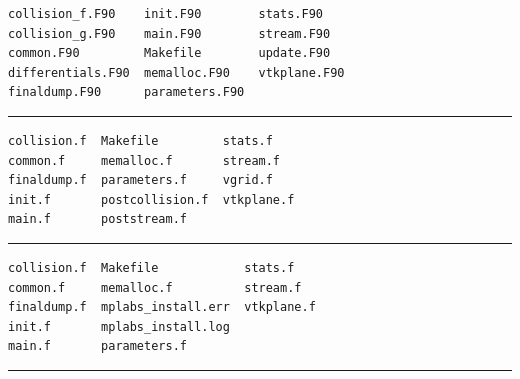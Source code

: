 \documentclass[12pt]{report}
\begin{document}

\begin{verbatim}
collision_f.F90    init.F90        stats.F90
collision_g.F90    main.F90        stream.F90
common.F90         Makefile        update.F90
differentials.F90  memalloc.F90    vtkplane.F90
finaldump.F90      parameters.F90
\end{verbatim}
\hrule\vspace{1em}
\pagebreak


\begin{verbatim}
collision.f  Makefile         stats.f
common.f     memalloc.f       stream.f
finaldump.f  parameters.f     vgrid.f
init.f       postcollision.f  vtkplane.f
main.f       poststream.f
\end{verbatim}
\hrule\vspace{1em}
\pagebreak


\begin{verbatim}
collision.f  Makefile            stats.f
common.f     memalloc.f          stream.f
finaldump.f  mplabs_install.err  vtkplane.f
init.f       mplabs_install.log
main.f       parameters.f
\end{verbatim}
\hrule\vspace{1em}

\pagebreak
\section*{}
\pagebreak
\end{document}
